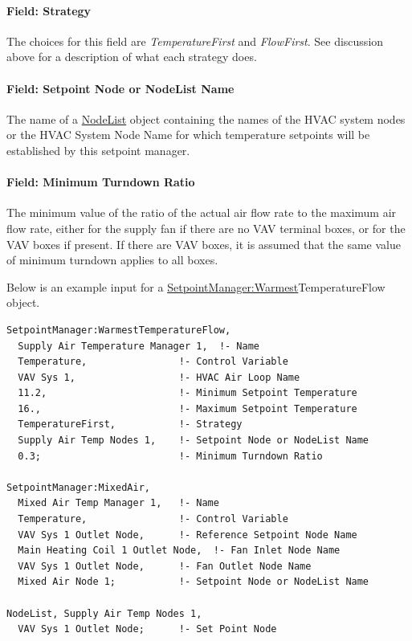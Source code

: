 \paragraph{Field: Strategy}\label{field-strategy-2}

The choices for this field are \emph{TemperatureFirst} and \emph{FlowFirst}. See discussion above for a description of what each strategy does.

\paragraph{Field: Setpoint Node or NodeList Name}\label{field-setpoint-node-or-nodelist-name-12}

The name of a \hyperref[nodelist]{NodeList} object containing the names of the HVAC system nodes or the HVAC System Node Name for which temperature setpoints will be established by this setpoint manager.

\paragraph{Field: Minimum Turndown Ratio}\label{field-minimum-turndown-ratio}

The minimum value of the ratio of the actual air flow rate to the maximum air flow rate, either for the supply fan if there are no VAV terminal boxes, or for the VAV boxes if present. If there are VAV boxes, it is assumed that the same value of minimum turndown applies to all boxes.

Below is an example input for a \hyperref[setpointmanagerwarmest]{SetpointManager:Warmest}TemperatureFlow object.

\begin{lstlisting}
SetpointManager:WarmestTemperatureFlow,
  Supply Air Temperature Manager 1,  !- Name
  Temperature,                !- Control Variable
  VAV Sys 1,                  !- HVAC Air Loop Name
  11.2,                       !- Minimum Setpoint Temperature
  16.,                        !- Maximum Setpoint Temperature
  TemperatureFirst,           !- Strategy
  Supply Air Temp Nodes 1,    !- Setpoint Node or NodeList Name
  0.3;                        !- Minimum Turndown Ratio

SetpointManager:MixedAir,
  Mixed Air Temp Manager 1,   !- Name
  Temperature,                !- Control Variable
  VAV Sys 1 Outlet Node,      !- Reference Setpoint Node Name
  Main Heating Coil 1 Outlet Node,  !- Fan Inlet Node Name
  VAV Sys 1 Outlet Node,      !- Fan Outlet Node Name
  Mixed Air Node 1;           !- Setpoint Node or NodeList Name

NodeList, Supply Air Temp Nodes 1,
  VAV Sys 1 Outlet Node;      !- Set Point Node
\end{lstlisting}

